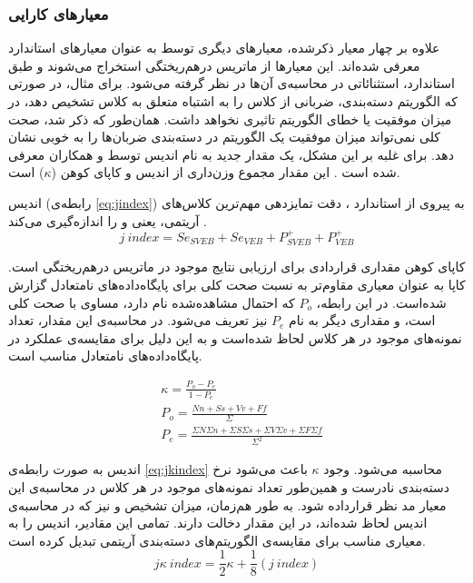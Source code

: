 \subsubsection{معیارهای کارایی}
\label{subsec:perf}
علاوه بر چهار معیار ذکرشده، معیارهای دیگری توسط  به عنوان معیارهای استاندارد معرفی شده‌اند. این معیارها از ماتریس درهم‌ریختگی استخراج می‌شوند و طبق  استاندارد‌، استثنائاتی در محاسبه‌ی آن‌ها در نظر گرفته می‌شود. برای مثال، در صورتی که الگوریتم دسته‌بندی، ضربانی از کلاس  را به اشتباه متعلق به کلاس  تشخیص دهد، در میزان موفقیت یا خطای الگوریتم تاثیری نخواهد داشت. 
همان‌طور که ذکر شد، صحت کلی نمی‌تواند میزان موفقیت یک الگوریتم در دسته‌بندی ضربان‌ها را به خوبی نشان دهد. برای غلبه بر این مشکل، یک مقدار جدید به نام اندیس  توسط  و همکاران معرفی شده است \cite{Mar2011}. این مقدار مجموع وزن‌داری از اندیس  و کاپای کوهن ($\kappa$) است.

اندیس  (رابطه‌ی \ref{eq:jindex}) به پیروی از استاندارد ، دقت تمایزدهی مهم‌ترین کلاس‌های آریتمی، یعنی  و  را اندازه‌گیری می‌کند \cite{Mondejar}.
\begin{equation}
	j\:index = Se_{SVEB} + Se_{VEB} + P^+_{SVEB} + P^+_{VEB}
	\label{eq:jindex}
\end{equation}

کاپای کوهن مقداری قراردادی برای ارزیابی نتایج موجود در ماتریس درهم‌ریختگی است. کاپا به عنوان معیاری مقاوم‌تر به نسبت صحت کلی برای پایگاه‌داده‌های نامتعادل گزارش شده‌است. در این رابطه، $P_o$ که احتمال مشاهده‌شده نام دارد، مساوی با صحت کلی است،‌ و مقداری دیگر به نام $P_e$ نیز تعریف می‌شود. در محاسبه‌ی این مقدار، تعداد نمونه‌های موجود در هر کلاس لحاظ شده‌است و به این دلیل برای مقایسه‌ی عملکرد در پایگاه‌داده‌های نامتعادل مناسب است. 

\begin{equation}
\begin{split}
	& \kappa = \frac{P_o - P_e}{1 - P_e} \\
	& P_o = \frac{Nn+Ss+Vv+Ff}{\Sigma} \\
	& P_e = \frac{\Sigma N \Sigma n + \Sigma S \Sigma s + \Sigma V \Sigma v + \Sigma F \Sigma f}{\Sigma^2}
\end{split}
\end{equation}

اندیس  به صورت رابطه‌ی \ref{eq:jkindex} محاسبه می‌شود. وجود $\kappa$ باعث می‌شود نرخ دسته‌بندی نادرست و همین‌طور تعداد نمونه‌های موجود در هر کلاس در محاسبه‌ی این معیار مد نظر قرارداده شود. به طور هم‌زمان، میزان تشخیص  و  نیز که در محاسبه‌ی اندیس  لحاظ شده‌اند،‌ در این مقدار دخالت دارند. تمامی این مقادیر،‌ اندیس  را به معیاری مناسب برای مقایسه‌ی الگوریتم‌های دسته‌بندی آریتمی تبدیل کرده است.  
\begin{equation}
	j\kappa\:index = \frac{1}{2}\kappa + \frac{1}{8}(j\:index)
\label{eq:jkindex}
\end{equation}



